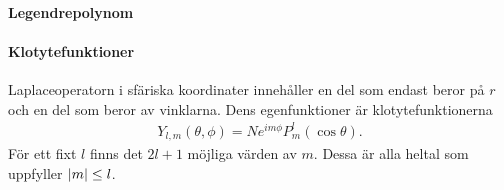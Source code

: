 \paragraph{Legendrepolynom}

\paragraph{Klotytefunktioner}
Laplaceoperatorn i sfäriska koordinater innehåller en del som endast beror på $r$ och en del som beror av vinklarna. Dens egenfunktioner är klotytefunktionerna
\begin{align*}
	Y_{l, m}(\theta, \phi) = Ne^{im\phi}P_{m}^{l}(\cos{\theta}).
\end{align*}
För ett fixt $l$ finns det $2l + 1$ möjliga värden av $m$. Dessa är alla heltal som uppfyller $\abs{m} \leq l$.
